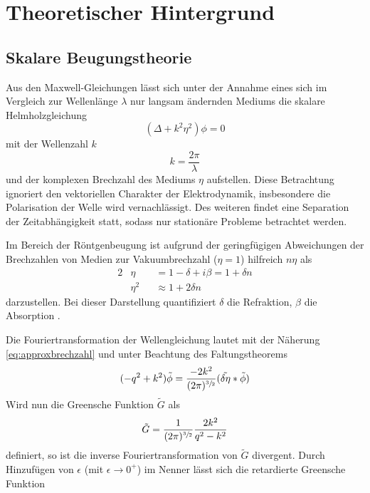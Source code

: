 \chapter{Theoretischer Hintergrund}
\label{c_theorie}
 
\section{Skalare Beugungstheorie}

Aus den Maxwell-Gleichungen lässt sich unter der Annahme eines sich im Vergleich zur Wellenlänge $\lambda$ nur langsam ändernden Mediums die skalare Helmholzgleichung 
\begin{equation}
(\Delta+k^2\eta^2)\phi=0
\end{equation}
mit der Wellenzahl $k$
\begin{equation}
	k=\frac{2\pi}{\lambda}
\end{equation} und der komplexen Brechzahl des Mediums $\eta$ aufstellen. Diese Betrachtung ignoriert den vektoriellen Charakter der Elektrodynamik, insbesondere die Polarisation der Welle wird vernachlässigt. Des weiteren findet eine Separation der Zeitabhängigkeit statt, sodass nur stationäre Probleme betrachtet werden.

Im Bereich der Röntgenbeugung ist aufgrund der geringfügigen Abweichungen der Brechzahlen von Medien zur Vakuumbrechzahl ($\eta=1$) hilfreich $n\eta$ als
\begin{alignat}{2}
\label{eq:brechzahl}
	&\eta&&=1-\delta+i\beta=1 + \delta n \\
\label{eq:approxbrechzahl}
	&\eta^2&&\approx 1 + 2\delta n
\end{alignat}
darzustellen. Bei dieser Darstellung quantifiziert $\delta$ die Refraktion, $\beta$ die Absorption \cite[S. 21]{attwood1999}.

Die Fouriertransformation der Wellengleichung lautet mit der Näherung \ref{eq:approxbrechzahl} und unter Beachtung des Faltungstheorems
\begin{equation}
	(-q^2+k^2)\tilde{\phi}=\frac{-2k^2}{(2\pi)^{\sfrac{3}{2}}}(\tilde{\delta \eta} \ast \tilde{\phi})
\end{equation}
Wird nun die Greensche Funktion $\tilde{G}$ als
\begin{equation}
	\tilde{G}=\frac{1}{(2\pi)^{\sfrac{3}{2}}}\frac{2k^2}{q^2-k^2}
\end{equation}
definiert, so ist die inverse Fouriertransformation von $\tilde{G}$ divergent. Durch Hinzufügen von $\epsilon$ (mit $\epsilon\rightarrow 0^+$) im Nenner lässt sich die retardierte Greensche Funktion 


